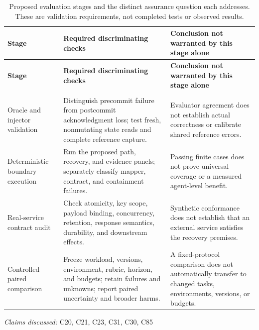\documentclass[11pt]{article}
\begin{document}
\begin{longtable}{@{}>{\raggedright\arraybackslash}p{}>{\raggedright\arraybackslash}p{}>{\raggedright\arraybackslash}p{}@{}}
\caption{Proposed evaluation stages and the distinct assurance question each addresses. These are validation requirements, not completed tests or observed results.}\\
\toprule
\textbf{Stage} & \textbf{Required discriminating checks} & \textbf{Conclusion not warranted by this stage alone}\\
\midrule
\endfirsthead
\toprule
\textbf{Stage} & \textbf{Required discriminating checks} & \textbf{Conclusion not warranted by this stage alone}\\
\midrule
\endhead
\midrule
\multicolumn{3}{r}{\footnotesize Continued on next page}\\
\endfoot
\bottomrule
\endlastfoot
Oracle and injector validation & Distinguish precommit failure from postcommit acknowledgment loss; test fresh, nonmutating state reads and complete reference capture. & Evaluator agreement does not establish actual correctness or calibrate shared reference errors.\\
Deterministic boundary execution & Run the proposed path, recovery, and evidence panels; separately classify mapper, contract, and containment failures. & Passing finite cases does not prove universal coverage or a measured agent-level benefit.\\
Real-service contract audit & Check atomicity, key scope, payload binding, concurrency, retention, response semantics, durability, and downstream effects. & Synthetic conformance does not establish that an external service satisfies the recovery premises.\\
Controlled paired comparison & Freeze workload, versions, environment, rubric, horizon, and budgets; retain failures and unknowns; report paired uncertainty and broader harms. & A fixed-protocol comparison does not automatically transfer to changed tasks, environments, versions, or budgets.\\
\end{longtable}
\par{}
\textit{Claims discussed: }C20, C21, C23, C31, C30, C85
\end{document}
